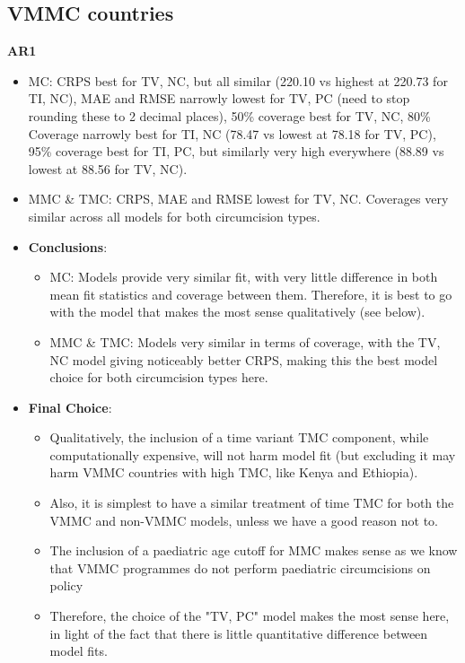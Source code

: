 \documentclass{article}
\begin{document}


\subsection{VMMC countries}
\label{sec:org09db5e8}

\textbf{AR1}

\begin{itemize}
    \item MC: CRPS best for TV, NC, but all similar (220.10 vs highest at 220.73 for TI, NC), MAE and RMSE narrowly lowest for TV, PC (need to stop rounding these to 2 decimal places), 50\% coverage best for TV, NC, 80\% Coverage narrowly best for TI, NC (78.47 vs lowest at 78.18 for TV, PC), 95\% coverage best for TI, PC, but similarly very high everywhere (88.89 vs lowest at 88.56 for TV, NC). 
    \item MMC \& TMC: CRPS, MAE and RMSE lowest for TV, NC. Coverages very similar across all models for both circumcision types. 
    \item \textbf{Conclusions}: 
    \begin{itemize}
        \item MC: Models provide very similar fit, with very little difference in both mean fit statistics and coverage between them. Therefore, it is best to go with the model that makes the most sense qualitatively (see below).
        \item MMC \& TMC: Models very similar in terms of coverage, with the TV, NC model giving noticeably better CRPS, making this the best model choice for both circumcision types here. 
    \end{itemize}
    \item \textbf{Final Choice}: 
    \begin{itemize}
      \item Qualitatively, the inclusion of a time variant TMC component, while computationally expensive, will not harm model fit (but excluding it may harm VMMC countries with high TMC, like Kenya and Ethiopia).
      \item Also, it is simplest to have a similar treatment of time TMC for both the VMMC and non-VMMC models, unless we have a good reason not to.
      \item The inclusion of a paediatric age cutoff for MMC makes sense as we know that VMMC programmes do not perform paediatric circumcisions on policy
      \item Therefore, the choice of the "TV, PC" model makes the most sense here, in light of the fact that there is little quantitative difference between model fits. 
    \end{itemize}
\end{itemize}
\end{document}
